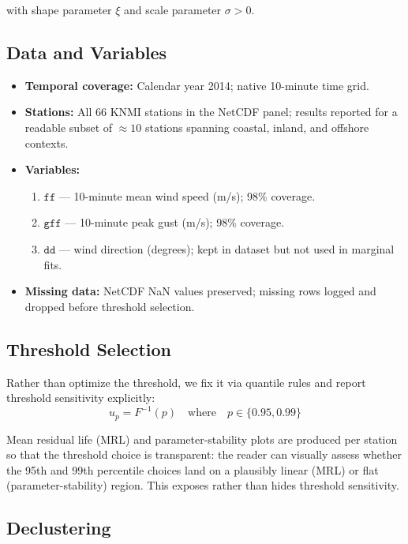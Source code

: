 with shape parameter $\xi$ and scale parameter $\sigma > 0$.

\subsection{Data and Variables}

\begin{itemize}
  \item \textbf{Temporal coverage:} Calendar year 2014; native 10-minute time grid.
  \item \textbf{Stations:} All 66 KNMI stations in the NetCDF panel; results reported for a readable subset of $\approx 10$ stations spanning coastal, inland, and offshore contexts.
  \item \textbf{Variables:} 
    \begin{enumerate}
      \item $\texttt{ff}$ --- 10-minute mean wind speed (m/s); 98\% coverage.
      \item $\texttt{gff}$ --- 10-minute peak gust (m/s); 98\% coverage.
      \item $\texttt{dd}$ --- wind direction (degrees); kept in dataset but not used in marginal fits.
    \end{enumerate}
  \item \textbf{Missing data:} NetCDF NaN values preserved; missing rows logged and dropped before threshold selection.
\end{itemize}

\subsection{Threshold Selection}

Rather than optimize the threshold, we fix it via quantile rules and report threshold sensitivity explicitly:
\[
u_p = F^{-1}(p) \quad \text{where} \quad p \in \{0.95, 0.99\}
\]

Mean residual life (MRL) and parameter-stability plots are produced per station so that the threshold choice is transparent: the reader can visually assess whether the 95th and 99th percentile choices land on a plausibly linear (MRL) or flat (parameter-stability) region. This exposes rather than hides threshold sensitivity.

\subsection{Declustering}

